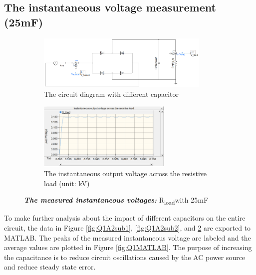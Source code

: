 \documentclass[12pt]{report} %
\begin{document}
\subsection{The instantaneous voltage measurement (25mF)} 
\begin{figure}[H]
    \centering %
    \begin{subfigure}[b]{\textwidth}
        \centering
        \includegraphics[width=0.9\textwidth]{Image/Q1/Q1_a3_circuit.PNG}
        \caption{The circuit diagram with different capacitor}
        \label{fig:Q1A3sub1}
    \end{subfigure}
    \hfill
    \centering %
    \begin{subfigure}[b]{\textwidth}
        \centering
        \includegraphics[width=0.7\textwidth]{Image/Q1/Q1_a3_Vload.PNG}
        \caption{The instantaneous output voltage across the resistive load (unit: kV)}
        \label{fig:Q1A3sub2}
    \end{subfigure} 
    \caption[The measured instantaneous voltages with 25mF capacitor]
    {\centering \textit{\textbf{The measured instantaneous voltages:}} R\textsubscript{load}with 25mF}
    \label{fig:Q1A3Figure}
\end{figure}
To make further analysis about the impact of different capacitors on the entire circuit, the data in 
Figure \ref{fig:Q1A2sub1}, \ref{fig:Q1A2sub2}, and \ref{fig:Q1A3sub2} are exported to MATLAB. 
The peaks of the measured instantaneous voltage are labeled and the average values are plotted in Figure \ref{fig:Q1MATLAB}.
The purpose of increasing the capacitance is to reduce circuit oscillations caused by the AC power source and reduce steady state error. 
\end{document}
